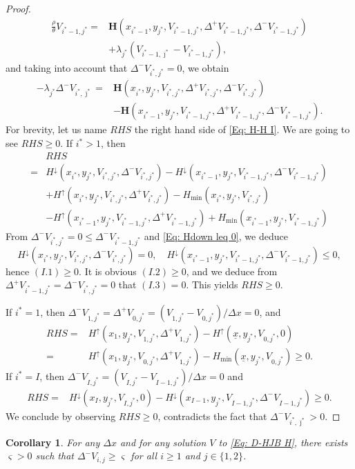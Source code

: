 \documentclass[11pt]{article}
\numberwithin{equation}{section}
\numberwithin{algorithm}{section}
\newtheorem{corollary}[corollary]{Corollary}
\newcommand{\lc}{\left(}
\newcommand{\rc}{\right)}
\newcommand{\ux}{{\underline x}}
\newcommand{\beq}{\begin{equation}}
\newcommand{\eeq}{\end{equation}}
\theoremstyle{plain}
\newcommand{\D}{\Delta}
\begin{document}
\begin{proof}
\begin{align*}
\frac{\rho}{\theta} V_{i^*-1,j^*}
={}&\boldsymbol{H}\lc x_{i^*-1},y_{j^*},V_{i^*-1,j^*},\D^+{V_{i^*-1,j^*}},\D^-{V_{i^*-1,j^*}}\rc\\
&+\lambda_{j^*}\lc V_{i^*-1,\bar \jmath^*}-V_{i^*-1,j^*} \rc,
\end{align*}
and taking into account that $\D^-{V_{i^*,j^*}}= 0$, we obtain
\beq\label{Eq: H-H I}
\begin{aligned}
-\lambda_{j^*}\D^-{V_{i^*,\bar \jmath^*}}={}&\boldsymbol{H}\lc x_{i^*},y_{j^*},V_{i^*,j^*},\D^+{V_{i^*,j^*}},\D^-{{V}_{i^*,j^*}}\rc\\
{}&-\boldsymbol{H}\lc x_{i^*-1},y_{j^*},{V}_{i^*-1,j^*},\D^+{V_{i^*-1,j^*}},\D^-{V_{i^*-1,j^*}}\rc.
\end{aligned}
\eeq
For brevity, let us name ${RHS}$ the right hand side of \cref{Eq: H-H I}. We are going to see ${RHS}\geq 0$. If {$i^*>1$}, then
\begin{align*}
&{RHS} \\
={}&{H}^{\downarrow} \lc x_{i^*},y_{j^*},V_{i^*,j^*},\D^-{V_{i^*,j^*}}\rc-{H}^{\downarrow} \lc x_{i^*-1},y_{j^*},V_{i^*-1,j^*},\D^-{V_{i^*-1,j^*}}\rc \tag{$I.1$}\\
{}&+{H}^{\uparrow} \lc x_{i^*},y_{j^*},V_{i^*,j^*},\D^+{V_{i^*,j^*}}\rc-{H}_{\min}\lc x_{i^*},y_{j^*},V_{i^*,j^*}\rc
\tag{$I.2$}\\
{}&-{H}^{\uparrow} \lc x_{i^*-1},y_{j^*},V_{i^*-1,j^*},\D^+{V_{i^*-1,j^*}}\rc+{H}_{\min}\lc x_{i^*-1},y_{j^*},V_{i^*-1,j^*}\rc \tag{$I.3$}
\end{align*}
From $\D^-{V_{i^*,j^*}}=0\leq \D^-{V_{i^*-1,j^*}}$ and \cref{Eq: Hdown leq 0}, we deduce 
$$
{H}^{\downarrow} \lc x_{i^*},y_{j^*},V_{i^*,j^*},\D^-{V_{i^*,j^*}}\rc=0,\quad {H}^{\downarrow} \lc x_{i^*-1},y_{j^*},V_{i^*-1,j^*},\D^-{V_{i^*-1,j^*}}\rc\leq 0,
$$
 hence $(I.1)\geq 0$. It is obvious $(I.2)\geq 0$, and we deduce from $\D^+{V_{i^*-1,j^*}}=\D^-{V_{i^*,j^*}}=0$ that $(I.3)= 0$. This yields ${RHS}\geq 0$.\par 
 If $i^*=1$, then $\D^-{V_{1,j^*}}=\D^+{V_{0,j^*}}=(V_{1,j^*}-V_{0,j^*})/\D x =0$, and 
 \begin{align*}
{RHS} ={}&{H}^{\uparrow} \lc x_{1},y_{j^*},V_{1,j^*},\D^+{V_{1,j^*}}\rc-{H}^{\uparrow} \lc \ux,y_{j^*},V_{0,j^*},0\rc\\
={}&{H}^{\uparrow} \lc x_{1},y_{j^*},V_{0,j^*},\D^+{V_{1,j^*}}\rc-{H}_{\min}\lc \ux,y_{j^*},V_{0,j^*}\rc\geq 0.
\end{align*}
If $i^*=I$, then $\D^-{V_{I,j^*}}=(V_{I,j^*}-V_{I-1,j^*})/\D x =0$ and  
 \begin{align*}
{RHS} ={}&{H}^{\downarrow} \lc x_{I},y_{j^*},V_{I,j^*},0\rc-{H}^{\downarrow} \lc x_{I-1},y_{j^*},V_{I-1,j^*},\D^-{V_{I-1,j^*}}\rc\geq 0.
\end{align*}
 We conclude by observing ${RHS}\geq 0$, contradicts the fact that $\D^-{V_{i^*,\bar \jmath^*}}>0$.  
\end{proof}
\begin{corollary}\label{Cor: Dv positive}
For any $\D x$ and for any solution $V$ to \cref{Eq: D-HJB H}, there exists $\varsigma>0$ such that
$\D^-{V_{i,j}}\geq \varsigma$ for all $i\geq 1$ and $j\in \{1,2\}$. 
\end{corollary}
\end{document}
